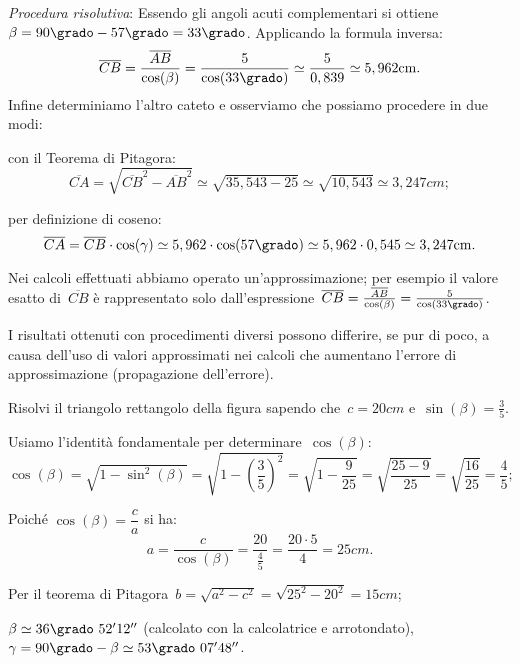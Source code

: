 \begin{exrig}
\begin{esempio}
\emph{Procedura risolutiva}:
Essendo gli angoli acuti complementari si ottiene~$\beta=90\grado-57\grado=33\grado$.
Applicando la formula inversa:
\[\overline{CB}=\frac{\overline{AB}}{\cos(\beta)}=\frac{5}{\cos(33\grado)}\simeq \frac{5}{0,839}\simeq 5,962\unit{cm}.\]
Infine determiniamo l'altro cateto e osserviamo che possiamo procedere in due modi:
\begin{itemize*}
 \item con il Teorema di Pitagora:
 \[\overline{CA}=\sqrt{\overline{CB}^{2}-\overline{AB}^{2}}\simeq \sqrt{35,543-25}\simeq \sqrt{10,543}\simeq 3,247\unit{cm};\]
 \item per definizione di coseno:
 \[\overline{CA}=\overline{CB}\cdot \cos(\gamma)\simeq 5,962 \cdot \cos(57\grado)\simeq 5,962\cdot 0,545\simeq 3,247\unit{cm}.\]
\end{itemize*}
\osservazione
\begin{enumeratea}
\item Nei calcoli effettuati abbiamo operato un'approssimazione; per esempio il valore esatto di~$\overline{CB}$ è rappresentato solo
dall'espressione~$\overline{CB}=\frac{\overline{AB}}{\cos(\beta)}=\frac{5}{\cos(33\grado)}$.
\item I risultati ottenuti con procedimenti diversi possono differire, se pur di poco, a causa dell'uso di valori approssimati
nei calcoli che aumentano l'errore di approssimazione (propagazione dell'errore).
\end{enumeratea}
 \end{esempio}

 \begin{esempio}
Risolvi il triangolo rettangolo della figura sapendo che~$c=20\unit{cm}$ e~$\sin(\beta)=\frac{3}{5}$.
\begin{center}
 
\end{center}
Usiamo l'identità fondamentale per determinare~$\cos(\beta)$:
\[\cos(\beta)=\sqrt{1-\sin^{2}(\beta)}=\sqrt{1-\left(\frac{3}{5}\right)^{2}}=\sqrt{1-\frac{9}{25}}=
    \sqrt{\frac{25-9}{25}}=\sqrt{\frac{16}{25}}=\frac{4}{5};\]

Poiché $\cos(\beta)=\dfrac{c}{a}$ si ha:
\[a=\frac{c}{\cos(\beta)}=\frac{20}{\frac{4}{5}}=\frac{20\cdot{5}}{4}=25\unit{cm}.\]

Per il teorema di Pitagora~$b=\sqrt{a^{2}-c^{2}}=\sqrt{25^{2}-20^{2}}=15\unit{cm}$;

$\beta\simeq 36\grado~52' 12''$ (calcolato con la calcolatrice e arrotondato), $\gamma = 90\grado - \beta \simeq 53\grado~07'48''$.
 \end{esempio}


\end{exrig}
